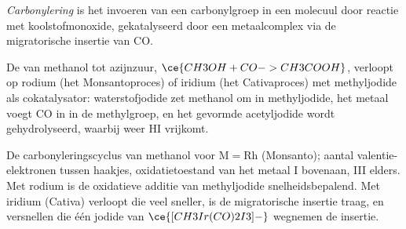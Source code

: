 \begin{definition}[Carbonylering]\label{def:b3:homogeneous-catalysis:carbonylation}
\emph{Carbonylering} is het invoeren van een
carbonylgroep in een molecuul door reactie met koolstofmonoxide,
gekatalyseerd door een metaalcomplex via de migratorische insertie van
CO.
\end{definition}

De  van methanol tot azijnzuur, $\ce{CH3OH + CO -> CH3COOH}$, verloopt op
rodium (het Monsantoproces) of iridium (het Cativaproces) met methyljodide
als cokatalysator: waterstofjodide zet methanol om in methyljodide, het
metaal voegt CO in in de methylgroep, en het gevormde acetyljodide wordt
gehydrolyseerd, waarbij weer HI vrijkomt.

\begin{omfigure}

{\small De carbonyleringscyclus van methanol voor $\mathrm M = \mathrm{Rh}$ (Monsanto); aantal
valentie-elektronen tussen haakjes, oxidatietoestand van het metaal I
bovenaan, III elders.
Met rodium is de oxidatieve additie van methyljodide snelheidsbepalend.
Met iridium (Cativa) verloopt die veel sneller, is de migratorische
insertie traag, en versnellen
 die één jodide van $\ce{[CH3Ir(CO)2I3]-}$ wegnemen de insertie.}
\end{omfigure}

